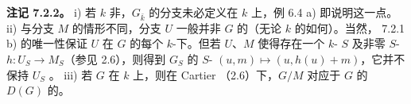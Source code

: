 \textbf{注记 7.2.2。}
i) 若 $k$ 非，$G_{\bar k}$ 的分支未必定义在 $k$ 上，例 6.4 a) 即说明这一点。
ii) 与分支 $M$ 的情形不同，分支 $U$ 一般并非 $G$ 的（无论 $k$ 的如何）。当然， 7.2.1 b) 的唯一性保证 $U$ 在 $G$ 的每个 $k$-下。但若 $U$、$M$ 使得存在一个 $k$- $S$ 及非零 $S$- $h:U_S\to M_S$（参见 2.6），则得到 $G_S$ 的 $S$- $(u,m)\mapsto(u,h(u)+m)$，它并不保持 $U_S$ 。
iii) 若 $G$ 在 $k$ 上，则在 Cartier （2.6）下，$G/M$ 对应于 $G$ 的 $D(G)$ 的。

